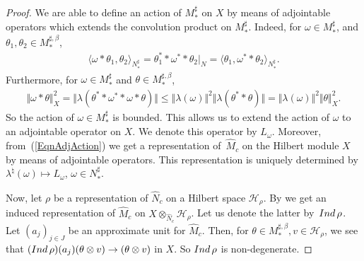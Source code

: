 \documentclass[11pt]{article}
\numberwithin{equation}{section}
\theoremstyle{definition}
\newcommand{\cHil}{\mathcal{H}}
\newcommand{\Ind}{{\rm Ind}\,}
\begin{document}
\begin{proof}
We are able to def\/ine an action of $M_\ast^\sharp$ on $X$ by  means of adjointable operators which extends the convolution product on $M_\ast^\sharp$. Indeed, for $\omega\in M_\ast^\sharp$, and $\theta_1, \theta_2 \in M_\ast^{\sharp,\beta} $,
\begin{gather*}%
\langle \omega \ast \theta_1, \theta_2 \rangle_{N_\ast^\sharp} = \theta_1^\ast \ast \omega^\ast \ast \theta_2\vert_{N} =  \langle  \theta_1, \omega^\ast \ast \theta_2 \rangle_{N_\ast^\sharp}.
\end{gather*}
Furthermore, for $\omega \in M_\ast^\sharp$ and $\theta \in M_\ast^{\sharp, \beta}$,
\begin{gather}\label{EqnAdjAction}
\Vert \omega \ast \theta \Vert_X^2 = \Vert \lambda (\theta^\ast \ast \omega^\ast \ast \omega \ast \theta) \Vert \leq \Vert \lambda(\omega) \Vert^2 \Vert \lambda(\theta^\ast \ast \theta) \Vert = \Vert \lambda(\omega) \Vert^2 \Vert \theta\Vert_X^2.
\end{gather}
So the action of $\omega \in M_\ast^\sharp$ is bounded. This allows us to extend the action of $\omega$ to an adjointable operator on $X$. We denote this operator by $L_\omega$.  Moreover, from~(\ref{EqnAdjAction}) we get a representation of~$\hat{M}_c$ on the Hilbert module $X$ by means of adjointable operators. This representation is uniquely determined by $\lambda^\natural(\omega)   \mapsto L_\omega$, $\omega \in N_\ast^\sharp$.


Now, let $\rho$ be a representation of $\hat{N}_c$ on a Hilbert space $\cHil_\rho$. By  \cite[Proposition 2.66]{RaeWil} we get an induced representation of $\hat{M}_c$ on $X  \otimes_{\hat{N}_c} \cHil_\rho$. Let us denote the latter by~$\Ind \rho$. Let $(a_j)_{j \in J}$ be an approximate unit for $\hat{M}_c$. Then, for $\theta \in M_\ast^{\sharp, \beta}, v \in \cHil_\rho$, we see that $(\Ind \rho)(a_j) (\theta \otimes v) \rightarrow (\theta \otimes v)$ in $X$. So $\Ind \rho$ is non-degenerate.


\end{proof}
\end{document}
